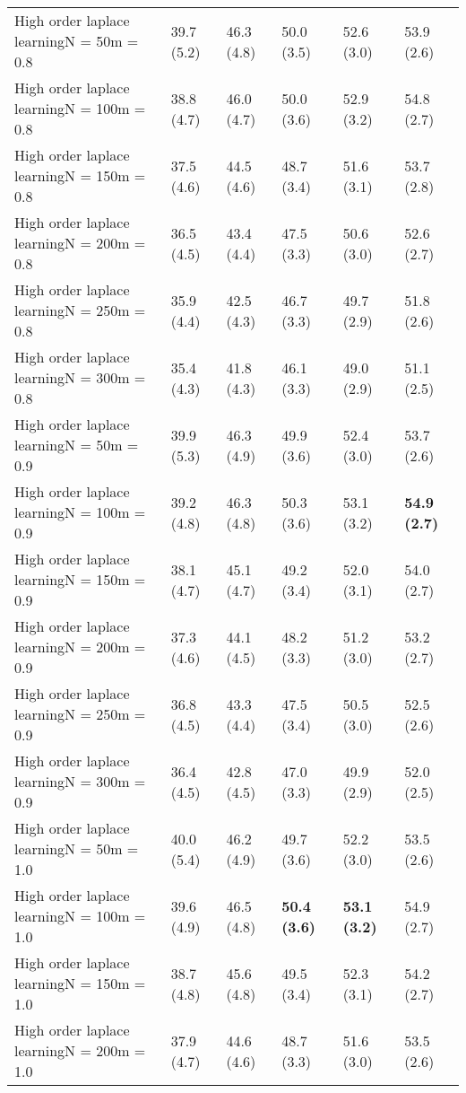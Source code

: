 \documentclass{article}
\begin{document}
\begin{table*}[t!]
\begin{center}
\begin{small}
\begin{sc}
\begin{tabular}{llllll}
High order laplace learningN = 50m = 0.8&39.7 (5.2)      &46.3 (4.8)      &50.0 (3.5)      &52.6 (3.0)      &53.9 (2.6)      \\
High order laplace learningN = 100m = 0.8&38.8 (4.7)      &46.0 (4.7)      &50.0 (3.6)      &52.9 (3.2)      &54.8 (2.7)      \\
High order laplace learningN = 150m = 0.8&37.5 (4.6)      &44.5 (4.6)      &48.7 (3.4)      &51.6 (3.1)      &53.7 (2.8)      \\
High order laplace learningN = 200m = 0.8&36.5 (4.5)      &43.4 (4.4)      &47.5 (3.3)      &50.6 (3.0)      &52.6 (2.7)      \\
High order laplace learningN = 250m = 0.8&35.9 (4.4)      &42.5 (4.3)      &46.7 (3.3)      &49.7 (2.9)      &51.8 (2.6)      \\
High order laplace learningN = 300m = 0.8&35.4 (4.3)      &41.8 (4.3)      &46.1 (3.3)      &49.0 (2.9)      &51.1 (2.5)      \\
High order laplace learningN = 50m = 0.9&39.9 (5.3)      &46.3 (4.9)      &49.9 (3.6)      &52.4 (3.0)      &53.7 (2.6)      \\
High order laplace learningN = 100m = 0.9&39.2 (4.8)      &46.3 (4.8)      &50.3 (3.6)      &53.1 (3.2)      &{\bf 54.9 (2.7)}\\
High order laplace learningN = 150m = 0.9&38.1 (4.7)      &45.1 (4.7)      &49.2 (3.4)      &52.0 (3.1)      &54.0 (2.7)      \\
High order laplace learningN = 200m = 0.9&37.3 (4.6)      &44.1 (4.5)      &48.2 (3.3)      &51.2 (3.0)      &53.2 (2.7)      \\
High order laplace learningN = 250m = 0.9&36.8 (4.5)      &43.3 (4.4)      &47.5 (3.4)      &50.5 (3.0)      &52.5 (2.6)      \\
High order laplace learningN = 300m = 0.9&36.4 (4.5)      &42.8 (4.5)      &47.0 (3.3)      &49.9 (2.9)      &52.0 (2.5)      \\
High order laplace learningN = 50m = 1.0&40.0 (5.4)      &46.2 (4.9)      &49.7 (3.6)      &52.2 (3.0)      &53.5 (2.6)      \\
High order laplace learningN = 100m = 1.0&39.6 (4.9)      &46.5 (4.8)      &{\bf 50.4 (3.6)}&{\bf 53.1 (3.2)}&54.9 (2.7)      \\
High order laplace learningN = 150m = 1.0&38.7 (4.8)      &45.6 (4.8)      &49.5 (3.4)      &52.3 (3.1)      &54.2 (2.7)      \\
High order laplace learningN = 200m = 1.0&37.9 (4.7)      &44.6 (4.6)      &48.7 (3.3)      &51.6 (3.0)      &53.5 (2.6)      \\

\end{tabular}
\end{sc}
\end{small}
\end{center}
\end{table*}
\end{document}
